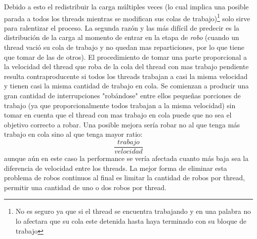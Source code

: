 \documentclass[conference]{IEEEtran}
\begin{document}
Debido a esto el redistribuir la carga múltiples veces (lo cual implica una posible parada a todos los threads mientras se modifican sus colas de trabajo)\footnote{No es seguro ya que si el thread se encuentra trabajando y en una palabra no lo afectara que su cola este detenida hasta haya terminado con su bloque de trabajo} solo sirve para ralentizar el proceso. 
La segunda razón y las más difícil de predecir es la distribución de la carga al momento de entrar en la etapa de \textit{robo} (cuando un thread vació su cola de trabajo y no quedan mas reparticiones, por lo que tiene que tomar de las de otros). El procedimiento de tomar una parte proporcional a la velocidad del thread que roba de la cola del thread con mas trabajo pendiente resulta contraproducente si todos los threads trabajan a casi la misma velocidad y tienen casi la misma cantidad de trabajo en cola. Se comienzan a producir una gran cantidad de interrupciones "robándose" entre ellos pequeñas porciones de trabajo (ya que proporcionalmente todos trabajan a la misma velocidad) sin tomar en cuenta que el thread con mas trabajo en cola puede que no sea el objetivo correcto a robar. Una posible mejora sería robar no al que tenga más trabajo en cola sino al que tenga mayor ratio: \[\frac{trabajo}{velocidad}\] aunque aún en este caso la performance se vería afectada cuanto más baja sea la diferencia de velocidad entre los threads. La mejor forma de eliminar esta problema de robos continuos al final es limitar la cantidad de robos por thread, permitir una cantidad de uno o dos robos por thread.
\end{document}
